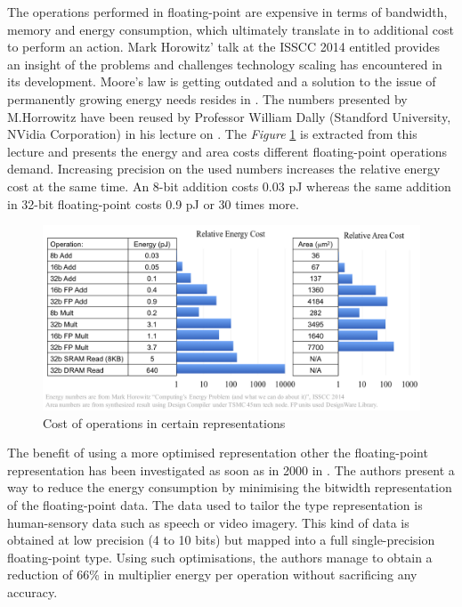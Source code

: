 The operations performed in floating-point are expensive in terms of bandwidth, memory and energy consumption, which ultimately translate in to additional cost to perform an action. Mark Horowitz' talk at the ISSCC 2014 \cite{Horowitz2014} entitled  provides an insight of the problems and challenges technology scaling has encountered in its development. Moore's law is getting outdated and a solution to the issue of permanently growing energy needs resides in . The numbers presented by M.Horrowitz have been reused by Professor William Dally (Standford University, NVidia Corporation) in his lecture on  \cite{Nips2015}. The \emph{Figure} \ref{fig:OpCosts} is extracted from this lecture and presents the energy and area costs different floating-point operations demand. Increasing precision on the used numbers increases the relative energy cost at the same time. An 8-bit addition costs 0.03 pJ whereas the same addition in 32-bit floating-point costs 0.9 pJ or 30 times more.

\begin{figure}[htbp]
	\centering
		\includegraphics[width=\textwidth]{Figures/OpCosts.png}
	\caption[Operation costs]{Cost of operations in certain representations \cite{Nips2015,Horowitz2014}}
	\label{fig:OpCosts}
\end{figure}

The benefit of using a more optimised representation other the floating-point representation has been investigated as soon as in 2000 in \cite{Tong2000}. The authors present a way to reduce the energy consumption by minimising the bitwidth representation of the floating-point data. The data used to tailor the type representation is human-sensory data such as speech or video imagery. This kind of data is obtained at low precision (4 to 10 bits) but mapped into a full single-precision floating-point type. Using such optimisations, the authors manage to obtain a reduction of 66\% in multiplier energy per operation without sacrificing any accuracy.

